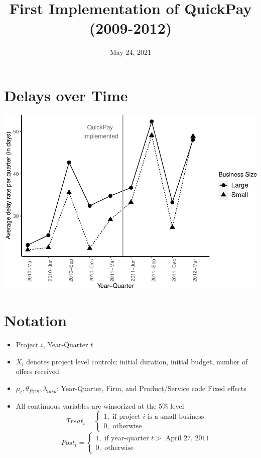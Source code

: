 \documentclass[
]{article}
\title{First Implementation of QuickPay (2009-2012)}
\author{}
\date{\vspace{-2.5em}May 24, 2021}
\providecommand{\tightlist}{%
  \setlength{\itemsep}{0pt}\setlength{\parskip}{0pt}}
\begin{document}
\maketitle

\hypertarget{delays-over-time}{%
\section{Delays over Time}\label{delays-over-time}}

\includegraphics{qp_first_implementation_files/figure-latex/plot-1.pdf}

\hypertarget{notation}{%
\section{Notation}\label{notation}}

\begin{itemize}
\tightlist
\item
  Project \(i\), Year-Quarter \(t\)
\item
  \(X_i\) denotes project level controls: initial duration, initial
  budget, number of offers received
\item
  \(\mu_t,\theta_{firm},\lambda_{task}\): Year-Quarter, Firm, and
  Product/Service code Fixed effects
\item
  All continuous variables are winsorized at the 5\% level
  \[ Treat_i = \begin{cases} 1, \text{ if project } i \text{ is a small business}\\
  0, \text{ otherwise} \end{cases}\]
  \[ Post_t = \begin{cases} 1, \text{ if year-quarter } t > \text{ April 27, 2011}\\
  0, \text{ otherwise} \end{cases}\]
\end{itemize}
\end{document}
